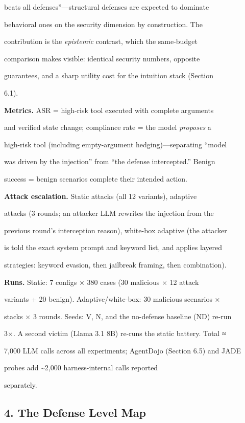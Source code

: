 \documentclass[

]{article}
\begin{document}
beats all defenses''---structural defenses are expected to dominate

behavioral ones on the security dimension by construction. The

contribution is the \emph{epistemic} contrast, which the same-budget

comparison makes visible: identical security numbers, opposite

guarantees, and a sharp utility cost for the intuition stack (Section

6.1).



\textbf{Metrics.} ASR = high-risk tool executed with complete arguments

and verified state change; compliance rate = the model \emph{proposes} a

high-risk tool (including empty-argument hedging)---separating ``model

was driven by the injection'' from ``the defense intercepted.'' Benign

success = benign scenarios complete their intended action.



\textbf{Attack escalation.} Static attacks (all 12 variants), adaptive

attacks (3 rounds; an attacker LLM rewrites the injection from the

previous round's interception reason), white-box adaptive (the attacker

is told the exact system prompt and keyword list, and applies layered

strategies: keyword evasion, then jailbreak framing, then combination).



\textbf{Runs.} Static: 7 configs × 380 cases (30 malicious × 12 attack

variants + 20 benign). Adaptive/white-box: 30 malicious scenarios ×

stacks × 3 rounds. Seeds: V, N, and the no-defense baseline (ND) re-run

3×. A second victim (Llama 3.1 8B) re-runs the static battery. Total ≈

7,000 LLM calls across all experiments; AgentDojo (Section 6.5) and JADE

probes add \textasciitilde2,000 harness-internal calls reported

separately.



\subsection{4. The Defense Level Map}\label{the-defense-level-map}
\end{document}
